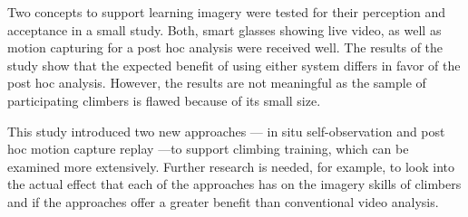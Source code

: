 Two concepts to support learning imagery were tested for their perception and acceptance in a small study. Both, smart glasses showing live video, as well as motion capturing for a post hoc analysis were received well. The results of the study show that the expected benefit of using either system differs in favor of the post hoc analysis. However, the results are not meaningful as the sample of participating climbers is flawed because of its small size.

This study introduced two new approaches --- in situ self-observation and post hoc motion capture replay ---to support climbing training, which can be examined more extensively. Further research is needed, for example, to look into the actual effect that each of the approaches has on the imagery skills of climbers and if the approaches offer a greater benefit than conventional video analysis. 
